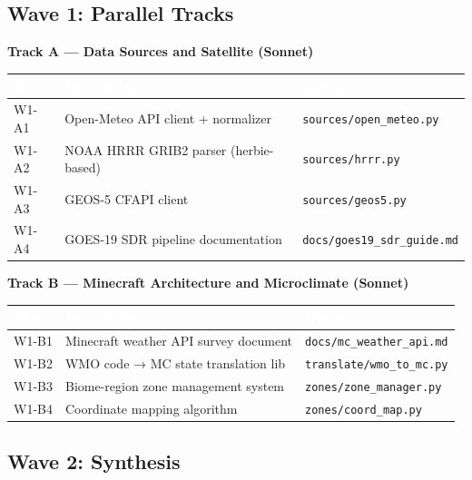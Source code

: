 \documentclass[11pt,letterpaper]{article}
\newcommand{\tableheader}[1]{\textbf{\sffamily\textcolor{white}{#1}}}
\begin{document}
\subsection{Wave 1: Parallel Tracks}

\textbf{Track A --- Data Sources and Satellite (Sonnet)}

\begin{center}
\begin{tabularx}{\textwidth}{L{2cm}L{5cm}X}
\toprule
{}
\tableheader{Task} & \tableheader{Description} & \tableheader{Output} \\
\midrule
W1-A1 & Open-Meteo API client + normalizer & \texttt{sources/open\_meteo.py} \\
W1-A2 & NOAA HRRR GRIB2 parser (herbie-based) & \texttt{sources/hrrr.py} \\
W1-A3 & GEOS-5 CFAPI client & \texttt{sources/geos5.py} \\
W1-A4 & GOES-19 SDR pipeline documentation & \texttt{docs/goes19\_sdr\_guide.md} \\
\bottomrule
\end{tabularx}
\end{center}

\textbf{Track B --- Minecraft Architecture and Microclimate (Sonnet)}

\begin{center}
\begin{tabularx}{\textwidth}{L{2cm}L{5cm}X}
\toprule
{}
\tableheader{Task} & \tableheader{Description} & \tableheader{Output} \\
\midrule
W1-B1 & Minecraft weather API survey document & \texttt{docs/mc\_weather\_api.md} \\
W1-B2 & WMO code → MC state translation lib & \texttt{translate/wmo\_to\_mc.py} \\
W1-B3 & Biome-region zone management system & \texttt{zones/zone\_manager.py} \\
W1-B4 & Coordinate mapping algorithm & \texttt{zones/coord\_map.py} \\
\bottomrule
\end{tabularx}
\end{center}

\subsection{Wave 2: Synthesis}
\end{document}
